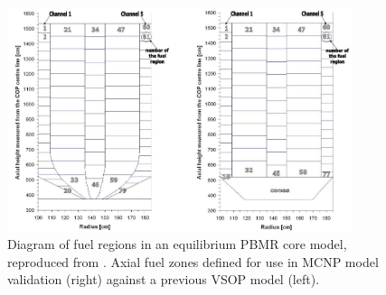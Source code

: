 \begin{figure}[H]
\centering
\includegraphics[width = 0.9\textwidth]{figures/bench-fuel-regions.png}
\caption[Diagram of fuel regions in an equilibrium PBMR core model]{Diagram of fuel regions in an equilibrium PBMR core model, reproduced from \cite{albornoz_mcnp_2006}.  Axial fuel zones defined for use in MCNP model validation (right) against a previous VSOP model (left).}
\label{fig:fuel-regions}
\end{figure}